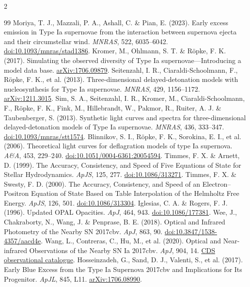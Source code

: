 \documentclass[11pt,a4paper]{article}
\begin{document}
{\begin{multicols}{2}
\begin{thebibliography}{99}
 Moriya, T. J., Mazzali, P. A., Ashall, C. \& Pian, E. (2023). Early excess emission in Type Ia supernovae from the interaction between supernova ejecta and their circumstellar wind. \textit{MNRAS}, 522, 6035--6042. \href{https://doi.org/10.1093/mnras/stad1386}{doi:10.1093/mnras/stad1386}.
 Kromer, M., Ohlmann, S. T. \& R\"opke, F. K. (2017). Simulating the observed diversity of Type Ia supernovae---Introducing a model data base. \href{https://arxiv.org/abs/1706.09879}{arXiv:1706.09879}.
 Seitenzahl, I. R., Ciaraldi-Schoolmann, F., R\"opke, F. K., et al. (2013). Three-dimensional delayed-detonation models with nucleosynthesis for Type Ia supernovae. \textit{MNRAS}, 429, 1156--1172. \href{https://arxiv.org/abs/1211.3015}{arXiv:1211.3015}.
 Sim, S. A., Seitenzahl, I. R., Kromer, M., Ciaraldi-Schoolmann, F., R\"opke, F. K., Fink, M., Hillebrandt, W., Pakmor, R., Ruiter, A. J. \& Taubenberger, S. (2013). Synthetic light curves and spectra for three-dimensional delayed-detonation models of Type Ia supernovae. \textit{MNRAS}, 436, 333--347. \href{https://doi.org/10.1093/mnras/stt1574}{doi:10.1093/mnras/stt1574}.
 Blinnikov, S. I., R\"opke, F. K., Sorokina, E. I., et al. (2006). Theoretical light curves for deflagration models of type Ia supernova. \textit{A\&A}, 453, 229--240. \href{https://doi.org/10.1051/0004-6361:20054594}{doi:10.1051/0004-6361:20054594}.
 Timmes, F. X. \& Arnett, D. (1999). The Accuracy, Consistency, and Speed of Five Equations of State for Stellar Hydrodynamics. \textit{ApJS}, 125, 277. \href{https://doi.org/10.1086/313271}{doi:10.1086/313271}.
 Timmes, F. X. \& Swesty, F. D. (2000). The Accuracy, Consistency, and Speed of an Electron--Positron Equation of State Based on Table Interpolation of the Helmholtz Free Energy. \textit{ApJS}, 126, 501. \href{https://doi.org/10.1086/313304}{doi:10.1086/313304}.
 Iglesias, C. A. \& Rogers, F. J. (1996). Updated OPAL Opacities. \textit{ApJ}, 464, 943. \href{https://doi.org/10.1086/177381}{doi:10.1086/177381}.
 Wee, J., Chakraborty, N., Wang, J. \& Penprase, B. E. (2018). Optical and Infrared Photometry of the Nearby SN 2017cbv. \textit{ApJ}, 863, 90. \href{https://doi.org/10.3847/1538-4357/aacd4e}{doi:10.3847/1538-4357/aacd4e}.
 Wang, L., Contreras, C., Hu, M., et al. (2020). Optical and Near-infrared Observations of the Nearby SN Ia 2017cbv. \textit{ApJ}, 904, 14. \href{https://cdsarc.cds.unistra.fr/viz-bin/ReadMe/J/ApJ/904/14}{CDS observational catalogue}.
 Hosseinzadeh, G., Sand, D. J., Valenti, S., et al. (2017). Early Blue Excess from the Type Ia Supernova 2017cbv and Implications for Its Progenitor. \textit{ApJL}, 845, L11. \href{https://arxiv.org/abs/1706.08990}{arXiv:1706.08990}.
\end{thebibliography}
\end{multicols}}
\end{document}
